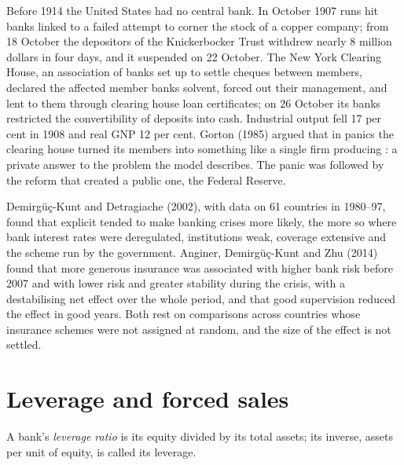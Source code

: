 \begin{record}
Before 1914 the United States had no central bank. In October 1907 runs hit banks linked to a failed attempt to corner the
stock of a copper company; from 18 October the depositors of the Knickerbocker Trust withdrew nearly 8 million dollars in
four days, and it suspended on 22 October. The New York Clearing House, an association of banks set up to settle cheques
between members, declared the affected member banks solvent, forced out their management, and lent to them through clearing
house loan certificates; on 26 October its banks restricted the convertibility of deposits into cash. Industrial output fell
17 per cent in 1908 and real GNP 12 per cent. Gorton (1985) argued that in panics the clearing house turned its members
into something like a single firm producing : a private answer to the problem the model describes. The
panic was followed by the reform that created a public one, the Federal Reserve.
\end{record}

\begin{debate}
Demirg\"u\c{c}-Kunt and Detragiache (2002), with data on 61 countries in 1980--97, found that explicit 
tended to make banking crises more likely, the more so where bank interest rates were deregulated, institutions weak,
coverage extensive and the scheme run by the government. Anginer, Demirg\"u\c{c}-Kunt and Zhu (2014) found that more
generous insurance was associated with higher bank risk before 2007 and with lower risk and greater stability during the
crisis, with a destabilising net effect over the whole period, and that good supervision reduced the effect in good years.
Both rest on comparisons across countries whose insurance schemes were not assigned at random, and the size of the effect
is not settled.
\end{debate}

\section{Leverage and forced sales}\label{sec:b2:banks-and-crises:leverage}

\begin{definition}\label{def:b2:banks-and-crises:leverage}
A bank's \emph{leverage ratio} is its equity divided by its total assets; its inverse, assets
per unit of equity, is called its leverage.
\end{definition}

